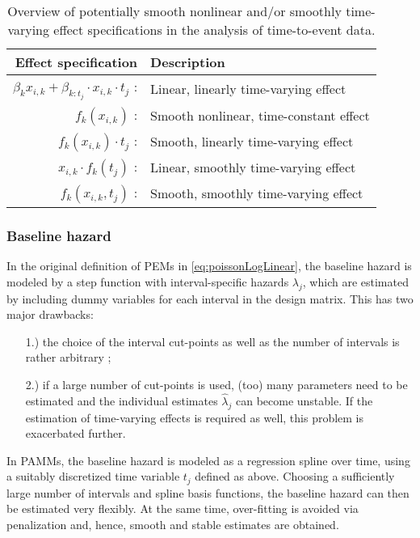 \documentclass[submit]{smj}
\begin{document}
\begin{table}[!hbtp]
\caption{Overview of potentially smooth nonlinear and/or smoothly
time-varying effect specifications in the analysis of time-to-event data.}
\label{tab:tvEffects}
\vspace{10pt}
\begin{center}
\begin{tabular}{rl}
  Effect specification & Description\\
  \hline
  $\beta_k x_{i,k} + \beta_{k:t_j}\cdot x_{i,k} \cdot t_j$ : & Linear, linearly
  time-varying effect\\
  $f_k(x_{i,k})$     : & Smooth nonlinear, time-constant effect\\
  $f_k(x_{i,k})\cdot t_j$ : & Smooth, linearly time-varying effect\\
  $x_{i,k}\cdot f_k(t_j)$ : & Linear, smoothly time-varying effect\\
  $f_k(x_{i,k}, t_j)$     : & Smooth, smoothly time-varying effect\\
\end{tabular}
\end{center}
\end{table}


\subsubsection{Baseline hazard}\label{sssec:baseline}
In the original definition of PEMs in \eqref{eq:poissonLogLinear}, the
baseline hazard is modeled by a step function with interval-specific hazards
$\lambda_j$, which are estimated by including dummy variables for each interval
in the design matrix. This has two major drawbacks:
\vspace{-10pt}
\begin{enumerate}
\setlength{\itemsep}{-5pt}
\item[1.)] the choice of the interval cut-points as well as the number of
intervals is rather arbitrary \citep[c.f.][]{Demarqui2008};
\item[2.)] if a large number of cut-points is used, (too) many parameters need
to be estimated and the individual estimates $\hat{\lambda}_j$ can become unstable.
If the estimation of time-varying effects is required as well,
this problem is exacerbated further.
\end{enumerate}
In PAMMs, the baseline hazard is modeled as a regression spline over time, using
a suitably discretized time variable $t_j$ defined as above.
Choosing a sufficiently large number of intervals and spline basis functions,
the baseline hazard can then be estimated very flexibly.
At the same time, over-fitting is avoided via
penalization and, hence, smooth and stable estimates are obtained.
\end{document}
